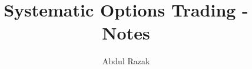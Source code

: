 \documentclass[a4paper,12pt]{book}
\begin{document}
    \author{Abdul Razak}
    \title{Systematic Options Trading  - Notes}
    \date{}

    \maketitle
    \tableofcontents
    \mainmatter
    
    
    
\end{document}
